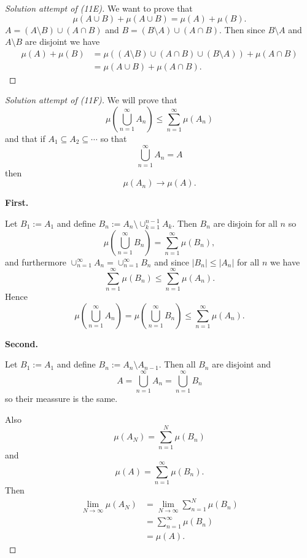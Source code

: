 \begin{proof}[Solution attempt of (11E)]
    We want to prove that 
    \[
        \mu(A \cup B) + \mu(A \cup B) = \mu(A) + \mu(B).
    \]
    $A = (A \setminus B) \cup (A \cap B)$ and 
    $B = (B \setminus A) \cup (A \cap B)$. Then 
    since $B \setminus A$ and $A \setminus B$ are disjoint we have 
    \begin{align*}
        \mu(A) + \mu(B) 
        &= \mu( (A \setminus B) \cup (A \cap B) \cup 
        (B \setminus A)) + 
        \mu(A \cap B) \\ 
        &= \mu(A \cup B) + \mu(A \cap B).
    \end{align*}
\end{proof}

\begin{proof}[Solution attempt of (11F)]
    We will prove that 
    \[
        \mu\left(\bigcup_{n=1}^\infty A_n\right)
        \leq 
        \sum_{n=1}^\infty \mu(A_n)
    \]
    and that if $A_1\subseteq A_2 \subseteq \cdots$ so that 
    \[
        \bigcup_{n=1}^\infty A_n = A
    \]
    then 
    \[
        \mu(A_n) \to \mu(A).
    \]

    \textbf{First.}

    Let $B_1 := A_1$ and define $B_n := A_n \setminus 
    \cup_{k=1}^{n-1} A_k$. 
    Then $B_n$ are disjoin for all $n$ so 
    \[
        \mu\left(\bigcup_{n=1}^\infty B_n\right)
        = 
        \sum_{n=1}^\infty \mu(B_n),
    \]
    and furthermore $\cup_{n=1}^\infty A_n = \cup_{n=1}^\infty B_n$
    and since $|B_n| \leq |A_n|$ for all $n$ we have 
    \[
        \sum_{n=1}^\infty \mu(B_n) \leq \sum_{n=1}^\infty \mu(A_n).
    \]
    Hence 
    \[
        \mu\left(\bigcup_{n=1}^\infty A_n\right)
        = \mu\left(\bigcup_{n=1}^\infty B_n\right)
        \leq \sum_{n=1}^\infty \mu(A_n).
    \]

    \textbf{Second.}

    Let $B_1 := A_1$ and define $B_n := A_n \setminus A_{n-1}$.
    Then all $B_n$ are disjoint and 
    \[
        A = \bigcup_{n=1}^\infty A_n = \bigcup_{n=1}^\infty B_n
    \]
    so their meassure is the same.

    Also 
    \[
        \mu(A_N) = \sum_{n=1}^N \mu(B_n)
    \]
    and 
    \[
        \mu(A) = \sum_{n=1}^\infty \mu(B_n).
    \]
    Then 
    \begin{align*}
        \lim_{N\to\infty} \mu(A_N) 
        &= \lim_{N\to\infty}\sum_{n=1}^N \mu(B_n) \\ 
        &= \sum_{n=1}^\infty \mu(B_n) \\ 
        &= \mu(A).
    \end{align*}
\end{proof}

